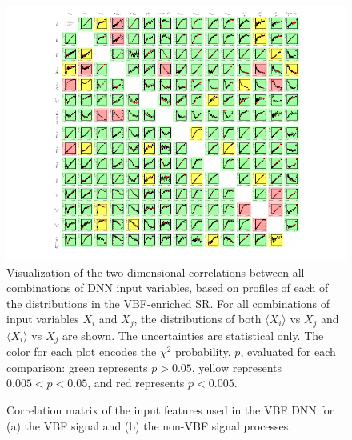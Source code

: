 \begin{figure}[t]
    \includegraphics[width=\textwidth,trim=45 0 45 0]{figures/hww/dnn/correlations_PROF_SR.pdf}
    \caption{Visualization of the two-dimensional correlations between all combinations of DNN input variables, based on profiles of each of the distributions in the VBF-enriched \TwoJet SR. For all combinations of input variables $X_i$ and $X_j$, the distributions of both $\langle X_i \rangle$ vs $X_j$ and $\langle X_i \rangle$ vs $X_j$ are shown. The uncertainties are statistical only. The color for each plot encodes the $\chi^2$ probability, $p$, evaluated for each comparison: green represents $p > 0.05$, yellow represents $0.005 < p < 0.05$, and red represents $p < 0.005$.}
    \label{fig:dnn-features-profiles}
\end{figure}




\begin{figure}[t]
    \caption{Correlation matrix of the input features used in the VBF DNN for (a) the VBF signal and (b) the non-VBF signal processes.}
    \label{fig:dnn-features-correlations}
\end{figure}

